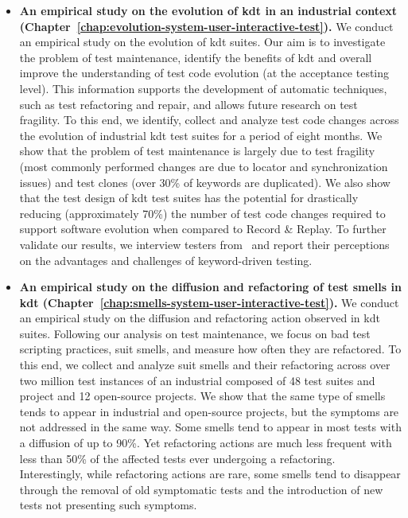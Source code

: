 \begin{itemize}
    \item \textbf{An empirical study on the evolution of \gls{kdt} in an industrial context (Chapter~\ref{chap:evolution-system-user-interactive-test}).} We conduct an empirical study on the evolution of \gls{kdt} suites. Our aim is to investigate the problem of test maintenance, identify the benefits of \gls{kdt} and overall improve the understanding of test code evolution (at the acceptance testing level). This information supports the development of automatic techniques, such as test refactoring and repair, and allows future research on test fragility. To this end, we identify, collect and analyze test code changes across the evolution of industrial \gls{kdt} test suites for a period of eight months. We show that the problem of test maintenance is largely due to test fragility (most commonly performed changes are due to locator and synchronization issues) and test clones (over 30\% of keywords are duplicated). We also show that the test design of \gls{kdt} test suites has the potential for drastically reducing (approximately 70\%) the number of test code changes required to support software evolution when compared to Record \& Replay. To further validate our results, we interview testers from \BGL\ and report their perceptions on the advantages and challenges of keyword-driven testing. 
    
    \item \textbf{An empirical study on the diffusion and refactoring of test smells in \gls{kdt} (Chapter~\ref{chap:smells-system-user-interactive-test}).} We conduct an empirical study on the diffusion and refactoring action observed in \gls{kdt} suites. Following our analysis on test maintenance, we focus on bad test scripting practices, \gls{suit} smells, and measure how often they  are refactored. To this end, we collect and analyze \gls{suit} smells and their refactoring across over two million test instances of an industrial composed of 48 test suites and project and 12 open-source projects. We show that the same type of smells tends to appear in industrial and open-source projects, but the symptoms are not addressed in the same way. Some smells tend to appear in most tests with a diffusion of up to 90\%. Yet refactoring actions are much less frequent with less than 50\% of the affected tests ever undergoing a refactoring. Interestingly,  while refactoring actions are rare, some smells tend to disappear through the removal of old symptomatic tests and the introduction of new tests not presenting such symptoms.
    

\end{itemize}
